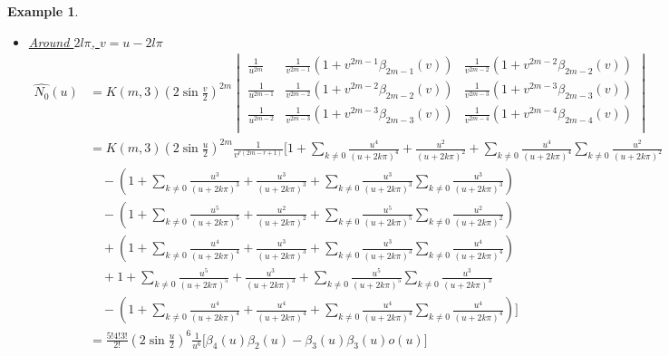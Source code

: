 \documentclass[a4paper, 11pt]{article}
\newtheorem{example}{Example}
\begin{document}
\begin{example}
\begin{enumerate}
\begin{itemize}
	\item \underline{Around $2l\pi$, $v=u-2l\pi$}
	  \begin{align*}
	    \hat{N_0}(u) &= K(m,3) {\left(2 \sin \frac{v}{2} \right)}^{2m}   \begin{vmatrix}
	      \frac{1}{u^{2m}} & \frac{1}{v^{2m-1}}(1+v^{2m-1}\beta_{2m-1}(v)) & 
	      \frac{1}{v^{2m-2}}(1+v^{2m-2}\beta_{2m-2}(v)) \\
	      \frac{1}{u^{2m-1}} & \frac{1}{v^{2m-2}}(1+v^{2m-2}\beta_{2m-2}(v)) & 
	      \frac{1}{v^{2m-3}}(1+v^{2m-3}\beta_{2m-3}(v)) \\
	      \frac{1}{u^{2m-2}} & \frac{1}{v^{2m-3}}(1+v^{2m-3}\beta_{2m-3}(v)) & 
	      \frac{1}{v^{2m-4}}(1+v^{2m-4}\beta_{2m-4}(v)) \\
	    \end{vmatrix} \\
	    &=  K(m,3) {\left(2 \sin \frac{u}{2} \right)}^{2m}  \frac{1}{v^{r(2m-r+1)}} \Big[ 1+ \sum_{k \neq 0} 
	      \frac{u^4}{{(u+2k\pi)}^{4}} + \frac{u^2}{{(u+2k\pi)}^{2}} + \sum_{k \neq 0}\frac{u^4}{{(u+2k\pi)}^{4}} 
	      \sum_{k \neq 0}\frac{u^2}{{(u+2k\pi)}^{2}} \\
	    & \quad - (1+ \sum_{k \neq 0} \frac{u^3}{{(u+2k\pi)}^{3}} + \frac{u^3}{{(u+2k\pi)}^{3}} + \sum_{k \neq 0} 
	    \frac{u^3}{{(u+2k\pi)}^{3}}\sum_{k \neq 0} \frac{u^3}{{(u+2k\pi)}^{3}})  \\
	    & \quad - (1+ \sum_{k \neq 0} \frac{u^5}{{(u+2k\pi)}^{5}} + \frac{u^2}{{(u+2k\pi)}^{2}} + \sum_{k \neq 
	    0}\frac{u^5}{{(u+2k\pi)}^{5}} \sum_{k \neq 0}\frac{u^2}{{(u+2k\pi)}^{2}}) \\
	    & \quad + (1+ \sum_{k \neq 0} \frac{u^4}{{(u+2k\pi)}^{4}} + \frac{u^3}{{(u+2k\pi)}^{3}} + \sum_{k \neq 0} 
	  \frac{u^3}{{(u+2k\pi)}^{3}}\sum_{k \neq 0} \frac{u^4}{{(u+2k\pi)}^{4}}) \\
	   &\quad + 1+ \sum_{k \neq 0} 
	      \frac{u^5}{{(u+2k\pi)}^{5}} + \frac{u^3}{{(u+2k\pi)}^{3}} + \sum_{k \neq 0}\frac{u^5}{{(u+2k\pi)}^{5}} \sum_{k 
	      \neq 0}\frac{u^3}{{(u+2k\pi)}^{3}} \\
	    & \quad - (1+ \sum_{k \neq 0} \frac{u^4}{{(u+2k\pi)}^{4}} + \frac{u^4}{{(u+2k\pi)}^{4}} + \sum_{k \neq 0} 
	    \frac{u^4}{{(u+2k\pi)}^{4}}\sum_{k \neq 0} \frac{u^4}{{(u+2k\pi)}^{4}}) \Big] \\
	    &= \frac{5!4!3!}{2!} {\left(2 \sin \frac{u}{2} \right)}^{6}  \frac{1}{u^6} \Big[\beta_4(u)\beta_2(u) - 
	    \beta_3(u)\beta_3(u) o(u) \Big]
	  \end{align*}
      \end{itemize}
  \end{enumerate}
\end{example}
\end{document}
